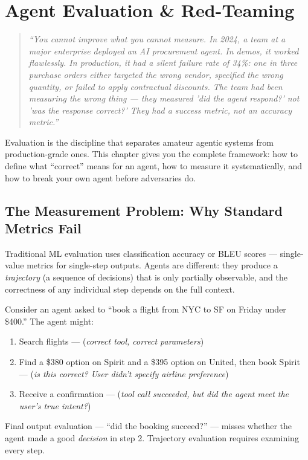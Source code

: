 \chapter{Agent Evaluation \& Red-Teaming}

\begin{quote}
\textit{``You cannot improve what you cannot measure. In 2024, a team at a major enterprise deployed an AI procurement agent. In demos, it worked flawlessly. In production, it had a silent failure rate of 34\%: one in three purchase orders either targeted the wrong vendor, specified the wrong quantity, or failed to apply contractual discounts. The team had been measuring the wrong thing — they measured 'did the agent respond?' not 'was the response correct?' They had a success metric, not an accuracy metric.''}
\end{quote}

Evaluation is the discipline that separates amateur agentic systems from production-grade ones. This chapter gives you the complete framework: how to define what ``correct'' means for an agent, how to measure it systematically, and how to break your own agent before adversaries do.

\section{The Measurement Problem: Why Standard Metrics Fail}

Traditional ML evaluation uses classification accuracy or BLEU scores — single-value metrics for single-step outputs. Agents are different: they produce a \textit{trajectory} (a sequence of decisions) that is only partially observable, and the correctness of any individual step depends on the full context.

Consider an agent asked to ``book a flight from NYC to SF on Friday under \$400.'' The agent might:
\begin{enumerate}
    \item Search flights — (\textit{correct tool, correct parameters}) 
    \item Find a \$380 option on Spirit and a \$395 option on United, then book Spirit — (\textit{is this correct? User didn't specify airline preference})
    \item Receive a confirmation — (\textit{tool call succeeded, but did the agent meet the user's true intent?})
\end{enumerate}

Final output evaluation — ``did the booking succeed?'' — misses whether the agent made a good \textit{decision} in step 2. Trajectory evaluation requires examining every step.

